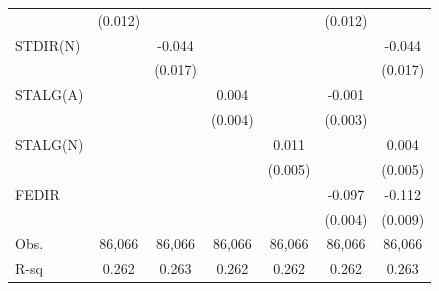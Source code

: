 {\begin{tabular}{l*{6}{c}}
                    &     (0.012)         &                     &                     &                     &     (0.012)         &                     \\
\addlinespace
STDIR(N)            &                     &      -0.044\sym{***}&                     &                     &                     &      -0.044\sym{**} \\
                    &                     &     (0.017)         &                     &                     &                     &     (0.017)         \\
\addlinespace
STALG(A)            &                     &                     &       0.004         &                     &      -0.001         &                     \\
                    &                     &                     &     (0.004)         &                     &     (0.003)         &                     \\
\addlinespace
STALG(N)            &                     &                     &                     &       0.011\sym{**} &                     &       0.004         \\
                    &                     &                     &                     &     (0.005)         &                     &     (0.005)         \\
\addlinespace
FEDIR               &                     &                     &                     &                     &      -0.097\sym{***}&      -0.112\sym{***}\\
                    &                     &                     &                     &                     &     (0.004)         &     (0.009)         \\
\midrule
Obs.                &      86,066         &      86,066         &      86,066         &      86,066         &      86,066         &      86,066         \\
R-sq                &       0.262         &       0.263         &       0.262         &       0.262         &       0.262         &       0.263         \\
\bottomrule
\end{tabular}
}
